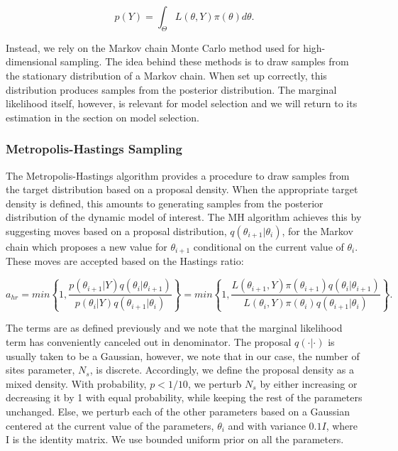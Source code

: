 $$p(Y) = \int_{\Theta} L(\theta, Y) \pi(\theta ) d\theta .$$

Instead, we rely on the Markov chain Monte Carlo \cite{gilks95} method used for high-dimensional sampling. The idea behind these methods is to draw samples from the stationary distribution of a Markov chain. When set up correctly, this distribution produces samples from the posterior distribution. The marginal likelihood itself, however, is relevant for model selection and we will return to its estimation in the section on model selection.

\subsubsection{Metropolis-Hastings Sampling}

The Metropolis-Hastings algorithm \cite{hastings70} provides a procedure to draw samples from the target distribution based on a proposal density. When the appropriate target density is defined, this amounts to generating samples from the posterior distribution of the dynamic model of interest. The MH algorithm achieves this by suggesting moves based on a proposal distribution, $q(\theta _{i+1}|\theta _{i})$, for the Markov chain which proposes a new value for $\theta_{i+1}$ conditional on the current value of $\theta_i$. These moves are accepted based on the Hastings ratio:

$$a_{hr} = min\left \{ 1, \frac{p(\theta _{i+1}| Y) q(\theta _{i}| \theta _{i+1})}{p(\theta _{i}| Y) q(\theta _{i+1}| \theta _{i})} \right \} = min\left \{ 1, \frac{L(\theta _{i+1}, Y) \pi(\theta _{i+1})q(\theta _{i}| \theta _{i+1})}{L(\theta _{i}, Y) \pi(\theta _{i})q(\theta _{i+1}| \theta _{i})} \right \} .$$

The terms are as defined previously and we note that the marginal likelihood term has conveniently canceled out in denominator. The proposal $q(\cdot | \cdot)$ is usually taken to be a Gaussian, however, we note that in our case, the number of sites parameter, $N_s$, is discrete. Accordingly, we define the proposal density as a mixed density. With probability, $p < 1/10$, we perturb $N_s$ by either increasing or decreasing it by 1 with equal probability, while keeping the rest of the parameters unchanged. Else, we perturb each of the other parameters based on a Gaussian centered at the current value of the parameters, $\theta _{i}$ and with variance $0.1I$, where I is the identity matrix. We use bounded uniform prior on all the parameters.

